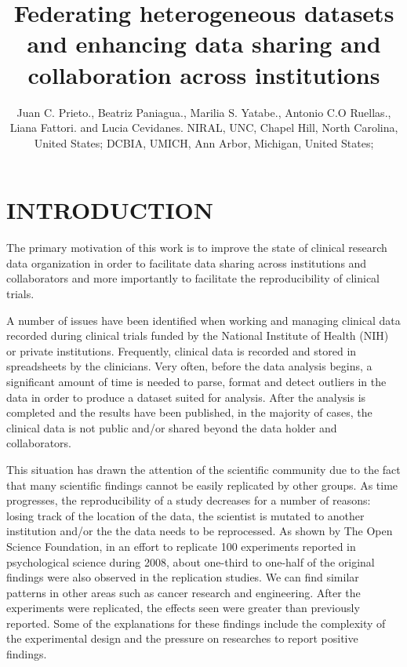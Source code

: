\documentclass[]{spie}  %
\title{Federating heterogeneous datasets and enhancing data sharing and collaboration across institutions}
\author{Juan C. Prieto.\supit{a}, Beatriz Paniagua.\supit{a}, Marilia S. Yatabe.\supit{b}, Antonio C.O Ruellas.\supit{b}, Liana Fattori.\supit{b} and Lucia Cevidanes.\supit{c}
\skiplinehalf
\supit{a}NIRAL, UNC, Chapel Hill, North Carolina, United States; 
\supit{b}DCBIA, UMICH, Ann Arbor, Michigan, United States;
}
\begin{document}
 
  \maketitle 

\begin{abstract}



\end{abstract}



\section{INTRODUCTION}
\label{sec:intro}

The primary motivation of this work is to improve the state of clinical research data organization in order to facilitate data sharing across institutions and collaborators and more importantly to facilitate the reproducibility of clinical trials.

A number of issues have been identified when working and managing clinical data recorded during clinical trials funded by the National Institute of Health 
(NIH) or private institutions. Frequently, clinical data is recorded and stored in spreadsheets by the clinicians. Very often, before the data analysis begins, 
a significant amount of time is needed to parse, format and detect outliers in the data in order to produce a dataset suited for analysis.
After the analysis is completed and the results have been published, in the majority of cases, 
the clinical data is not public and/or shared beyond the data holder and collaborators. 

This situation has drawn the attention of the scientific community due to the fact that many scientific findings cannot be easily replicated by other groups. 
As time progresses, the reproducibility of a study decreases for a number of reasons: losing track of the location of the data, the scientist is mutated to another institution and/or the the data needs to be reprocessed. As shown by The Open Science Foundation, in an effort to replicate 100 experiments reported in psychological science during 2008\cite{open2015estimating}, about one-third to one-half of the original findings were also observed in the replication studies. 
We can find similar patterns in other areas such as cancer research and engineering. 
After the experiments were replicated, the effects seen were greater than previously reported. 
Some of the explanations for these findings include the complexity of the experimental design and the pressure on researches to report positive findings. 
\end{document}
